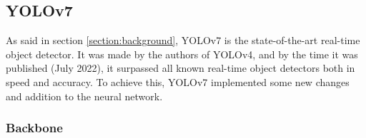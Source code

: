 

  
      
  \subsection{YOLOv7}
  As said in section \ref{section:background}, YOLOv7 is the state-of-the-art real-time object detector.
  It was made by the authors of YOLOv4, and by the time it was published (July 2022), it surpassed all 
  known real-time object detectors both in speed and accuracy. To achieve this, YOLOv7 implemented some new
  changes and addition to the neural network. 
  \subsubsection{Backbone}

